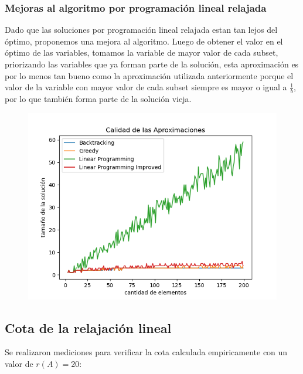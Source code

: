 \subsubsection{Mejoras al algoritmo por programación lineal relajada}

Dado que las soluciones por programación lineal relajada estan tan lejos del
óptimo, proponemos una mejora al algoritmo. Luego de obtener el valor en el
óptimo de las variables, tomamos la variable de mayor valor de cada subset,
priorizando las variables que ya forman parte de la solución, esta aproximación
es por lo menos tan bueno como la aproximación utilizada anteriormente porque
el valor de la variable con mayor valor de cada subset siempre es mayor o igual
a $\frac{1}{b}$, por lo que también forma parte de la solución vieja.

\begin{figure}[H]
    \centering
    \includegraphics[width=1\textwidth]{img/quality2.png}
\end{figure}

\newpage

\subsection{Cota de la relajación lineal}

Se realizaron mediciones para verificar la cota calculada empiricamente con un
valor de $r(A) = 20$:

